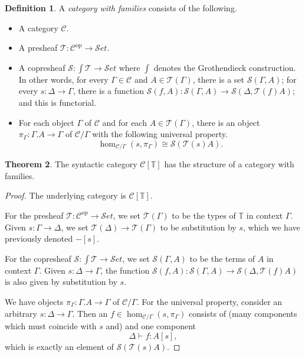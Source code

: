 \documentclass{article}
\theoremstyle{definition}
\newtheorem{definition}{Definition}[section]
\newtheorem{theorem}[definition]{Theorem}
\newcommand{\types}{\mathcal T}
\newcommand{\terms}{\mathcal S}
\newcommand{\T}{\mathbb T}
\newcommand{\C}{\mathcal C}
\newcommand{\Set}{{\mathcal S}et}
\newcommand{\syncat}[1]{\C [#1]}
\newcommand{\op}{\mathrm {op}}
\begin{document}
\begin{definition}
    A \emph{category with families} consists of the following.
    \begin{itemize}
        \item A category $\C$.
        \item A presheaf $\types : \C^\op \to \Set$.
        \item A copresheaf $\terms : \int \types \to \Set$ where $\int$ denotes the Grothendieck construction. In other words, for every $\Gamma \in \C$ and $A \in \types (\Gamma)$, there is a set $\terms (\Gamma, A)$; for every $s: \Delta \to \Gamma$, there is a function $\terms(f,A):  \terms (\Gamma, A) \to \terms (\Delta, \types(f)A)$; and this is functorial.
        \item For each object $\Gamma$ of $\C$ and for each $A \in \types(\Gamma)$, there is an object $\pi_\Gamma : \Gamma.A \to \Gamma $ of $\C / \Gamma$ with the following universal property.
                \[ \hom_{\C / \Gamma}(s, \pi_\Gamma) \cong \terms(\types(s) A). \]
    \end{itemize}
\end{definition}

\begin{theorem}
    The syntactic category $\syncat{\T}$ has the structure of a category with families.
\end{theorem}
\begin{proof}
    The underlying category is $\syncat{\T}$.

    For the presheaf $\types : \C^\op \to \Set$, we set $\types(\Gamma)$ to be the types of $\T$ in context $\Gamma$. Given $s : \Gamma \to \Delta$, we set $\types(\Delta) \to \types(\Gamma)$ to be substitution by $s$, which we have previously denoted $-[s]$.

    For the copresheaf $\terms : \int \types \to \Set$, we set $\terms(\Gamma, A)$ to be the terms of $A$ in context $\Gamma$. Given $s : \Delta \to \Gamma$, the function $\terms(f,A):  \terms (\Gamma, A) \to \terms (\Delta, \types(f)A)$ is also given by substitution by $s$.

    We have objects $\pi_\Gamma : \Gamma.A \to \Gamma $ of $\C / \Gamma$. For the universal property, consider an arbitrary $s : \Delta \to \Gamma$. Then an $f \in \hom_{\C / \Gamma}(s, \pi_\Gamma)$ consists of (many components which must coincide with $s$ and) and one component 
    \[ \Delta \vdash f : A[s], \]
    which is exactly an element of $\terms(\types(s) A)$.
\end{proof}
\end{document}

